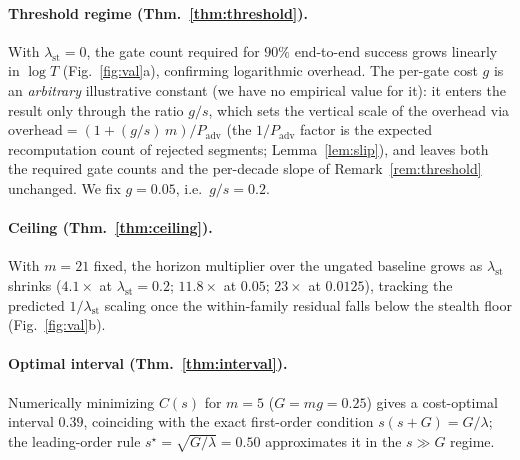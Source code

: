 \documentclass[11pt]{article}
\theoremstyle{remark}
\newcommand{\lst}{\lambda_{\mathrm{st}}}
\newcommand{\Padv}{P_{\mathrm{adv}}}
\begin{document}
\paragraph{Threshold regime (Thm.~\ref{thm:threshold}).} With $\lst=0$, the gate count required
for $90\%$ end-to-end success grows linearly in $\log T$ (Fig.~\ref{fig:val}a), confirming
logarithmic overhead.
The per-gate cost $g$ is an \emph{arbitrary} illustrative constant
(we have no empirical value for it): it enters the result only through the ratio $g/s$, which
sets the vertical scale of the overhead via $\text{overhead}=(1+(g/s)\,m)/\Padv$ (the $1/\Padv$
factor is the expected recomputation count of rejected segments; Lemma~\ref{lem:slip}), and leaves
both the required gate counts and the per-decade slope of Remark~\ref{rem:threshold} unchanged.
We fix
$g=0.05$, i.e.\ $g/s=0.2$.
\paragraph{Ceiling (Thm.~\ref{thm:ceiling}).} With $m=21$ fixed, the horizon multiplier over the
ungated baseline grows as $\lst$ shrinks ($4.1\times$ at $\lst=0.2$; $11.8\times$ at $0.05$;
$23\times$ at $0.0125$), tracking the predicted $1/\lst$ scaling once the within-family residual
falls below the stealth floor (Fig.~\ref{fig:val}b).
\paragraph{Optimal interval (Thm.~\ref{thm:interval}).} Numerically minimizing $C(s)$ for $m=5$
($G=mg=0.25$) gives a cost-optimal interval $0.39$, coinciding with the exact first-order condition
$s(s+G)=G/\lambda$; the leading-order rule $s^\star=\sqrt{G/\lambda}=0.50$ approximates it in the
$s\gg G$ regime.
\end{document}
